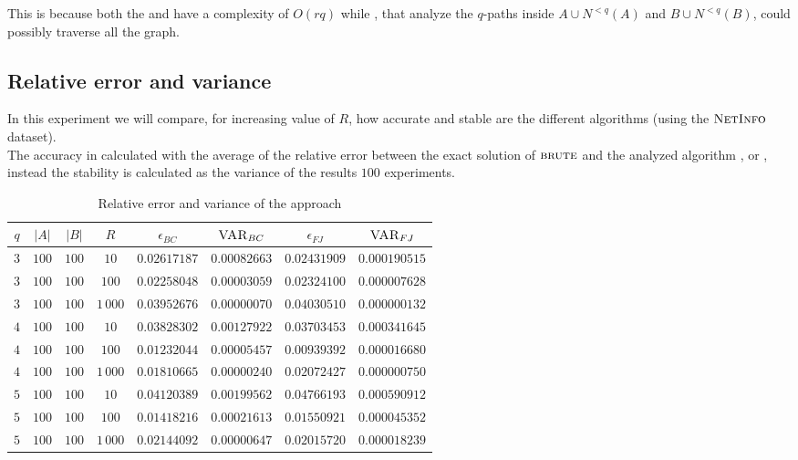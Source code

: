 	This is because both the \fsamp and \base have a complexity of $O(rq)$ while 
	\fcount, that analyze the $q$-paths inside $A \cup N^{<q}(A)$ and $B \cup N^{<q}(B)$, could possibly traverse all the graph.
	 
	\subsection*{Relative error and variance}
	
	In this experiment we will compare, for increasing value of $R$, how accurate and stable are the different algorithms (using the $\textsc{NetInfo}$ dataset).\\
		
	The accuracy in calculated with the average of the relative error between the exact solution of $\textsc{brute}$ and the analyzed algorithm \fcount, \fsamp or \base, instead the stability is calculated as the variance of the results $100$ experiments.

	\begin{table}[h]
		\centering
		\label{my-label}
		\begin{tabular}{|c|c|c|c|c|c|c|c|}
			\hline
			$q$ & $|A|$ & $|B|$ & $R$      & $\epsilon_{BC}$ & $\textsc{VAR}_{BC}$ & $\epsilon_{FJ}$ & $\textsc{VAR}_{FJ}$ \\ \hline \hline
			$3$ & $100$ & $100$ & $10$     & $0.02617187$ & $0.00082663$ & $0.02431909$ & $0.000190515$ \\ \hline
			$3$ & $100$ & $100$ & $100$    & $0.02258048$ & $0.00003059$ & $0.02324100$ & $0.000007628$ \\ \hline
			$3$ & $100$ & $100$ & $1\,000$ & $0.03952676$ & $0.00000070$ & $0.04030510$ & $0.000000132$ \\ \hline \hline
			$4$ & $100$ & $100$ & $10$     & $0.03828302$ & $0.00127922$ & $0.03703453$ & $0.000341645$ \\ \hline
			$4$ & $100$ & $100$ & $100$    & $0.01232044$ & $0.00005457$ & $0.00939392$ & $0.000016680$ \\ \hline
			$4$ & $100$ & $100$ & $1\,000$ & $0.01810665$ & $0.00000240$ & $0.02072427$ & $0.000000750$ \\ \hline \hline
			$5$ & $100$ & $100$ & $10$     & $0.04120389$ & $0.00199562$ & $0.04766193$ & $0.000590912$ \\ \hline
			$5$ & $100$ & $100$ & $100$    & $0.01418216$ & $0.00021613$ & $0.01550921$ & $0.000045352$ \\ \hline
			$5$ & $100$ & $100$ & $1\,000$ & $0.02144092$ & $0.00000647$ & $0.02015720$ & $0.000018239$ \\ \hline
			
		\end{tabular}
		\caption{Relative error and variance of the \fcount approach}	
	\end{table}

